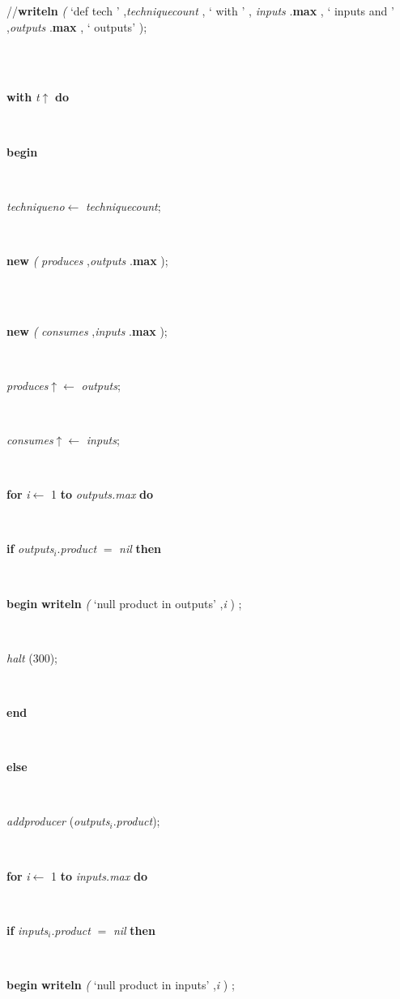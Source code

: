 \begin{tabbing}
\parbox{14cm}{\textsf{//\textbf{writeln} \textit{(} \textrm{\textup { `def tech ' } },\textit{techniquecount} , \textrm{\textup { ` with ' } }, \textit{inputs} .\textbf{max} ,\textrm{\textup { ` inputs and ' } },\textit{outputs} .\textbf{max} ,\textrm{\textup { ` outputs' } });}}\\
\\
\+\parbox{14cm}{\textsf {\textbf {with } \textsf{\textit{t}$\uparrow$\textit{}} \textbf{ do } }}\\
\<\parbox{14cm}{\textsf{\textbf{begin} }}\\
\parbox{14cm}{\textsf{\textit{techniqueno}$\leftarrow$ \textit{techniquecount}}; }\\
\parbox{14cm}{\textsf{\textbf{new} \textit{(} \textit{produces} ,\textit{outputs} .\textbf{max} );}}\\
\\
\parbox{14cm}{\textsf{\textbf{new} \textit{(} \textit{consumes} ,\textit{inputs} .\textbf{max} );}}\\
\parbox{14cm}{\textsf{\textit{produces}$\uparrow$\textit{}$\leftarrow$ \textit{outputs}}; }\\
\parbox{14cm}{\textsf{\textit{consumes}$\uparrow$\textit{}$\leftarrow$ \textit{inputs}}; }\\
\+\parbox{14cm}{\textsf {\textbf {for } \textsf{\textit{i}$\leftarrow$ 1} \textbf{ to } \textsf{\textit{outputs.max}} \textbf{ do } }}\\
\+\parbox{14cm}{\textsf {\textbf {if } \textsf{\textit{outputs}$_{\textit{i}}$.\textit{product} $=$ \textit{nil}} \textbf{ then } }}\\
\-\-\+\parbox{14cm}{\textsf{\textbf{begin}  \textbf{writeln} \textit{(} \textrm{\textup { `null product in outputs' } },\textit{i} ) ;}}\\
\parbox{14cm}{\textsf{\textit{halt} (300)}; }\\
\<\-\parbox{14cm}{\textsf{\textbf{end} }}\\
\+\parbox{14cm}{\textsf{\textbf{else} }}\\
\-\parbox{14cm}{\textsf{\textit{addproducer} (\textit{outputs}$_{\textit{i}}$.\textit{product})}; }\\
\+\parbox{14cm}{\textsf {\textbf {for } \textsf{\textit{i}$\leftarrow$ 1} \textbf{ to } \textsf{\textit{inputs.max}} \textbf{ do } }}\\
\+\parbox{14cm}{\textsf {\textbf {if } \textsf{\textit{inputs}$_{\textit{i}}$.\textit{product} $=$ \textit{nil}} \textbf{ then } }}\\
\-\-\+\parbox{14cm}{\textsf{\textbf{begin}  \textbf{writeln} \textit{(} \textrm{\textup { `null product in inputs' } },\textit{i} ) ;}}\\

\end{tabbing}
